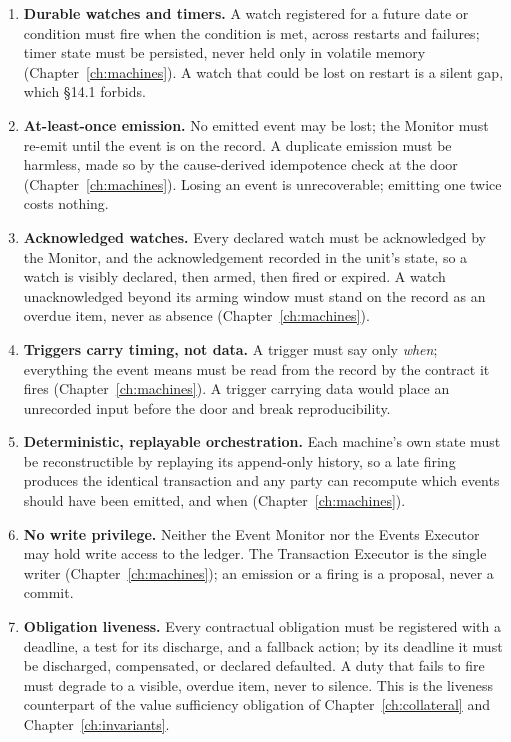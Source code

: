 \begin{enumerate}[label=\textbf{M\arabic*.}, ref=M\arabic*, leftmargin=*, itemsep=3pt]
\item \textbf{Durable watches and timers.} A watch registered for a future date or
  condition must fire when the condition is met, across restarts and failures; timer state
  must be persisted, never held only in volatile memory (Chapter~\ref{ch:machines}). A
  watch that could be lost on restart is a silent gap, which \S 14.1 forbids.
\item \textbf{At-least-once emission.} No emitted event may be lost; the Monitor must
  re-emit until the event is on the record. A duplicate emission must be harmless, made so
  by the cause-derived idempotence check at the door (Chapter~\ref{ch:machines}). Losing an
  event is unrecoverable; emitting one twice costs nothing.
\item \textbf{Acknowledged watches.} Every declared watch must be acknowledged by the
  Monitor, and the acknowledgement recorded in the unit's state, so a watch is visibly
  declared, then armed, then fired or expired. A watch unacknowledged beyond its arming
  window must stand on the record as an overdue item, never as absence
  (Chapter~\ref{ch:machines}).
\item \textbf{Triggers carry timing, not data.} A trigger must say only \emph{when};
  everything the event means must be read from the record by the contract it fires
  (Chapter~\ref{ch:machines}). A trigger carrying data would place an unrecorded input
  before the door and break reproducibility.
\item \textbf{Deterministic, replayable orchestration.} Each machine's own state must be
  reconstructible by replaying its append-only history, so a late firing produces the
  identical transaction and any party can recompute which events should have been emitted,
  and when (Chapter~\ref{ch:machines}).
\item \textbf{No write privilege.} Neither the Event Monitor nor the Events Executor may
  hold write access to the ledger. The Transaction Executor is the single writer
  (Chapter~\ref{ch:machines}); an emission or a firing is a proposal, never a commit.
\item \textbf{Obligation liveness.} Every contractual obligation must be registered with a
  deadline, a test for its discharge, and a fallback action; by its deadline it must be
  discharged, compensated, or declared defaulted. A duty that fails to fire must degrade to
  a visible, overdue item, never to silence. This is the liveness counterpart of the value
  sufficiency obligation of Chapter~\ref{ch:collateral} and Chapter~\ref{ch:invariants}.
\end{enumerate}

